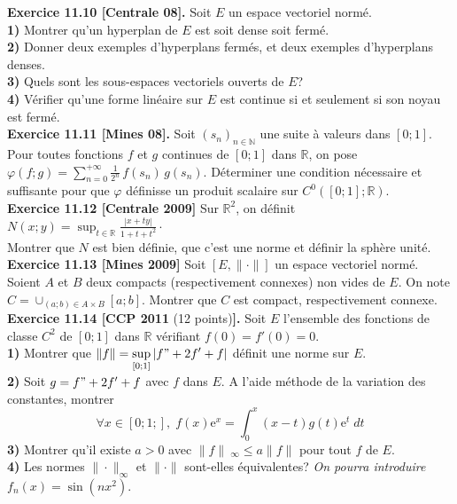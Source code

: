 \documentclass[a4paper,12pt,francais]{article}
\newcommand{\field}[1]{\mathbb{#1}}
\newcommand{\N}{\field{N}}
\newcommand{\R}{\field{R}}
\newcommand{\e}{\mbox{e}}
\begin{document}
 \noindent
 {\bf Exercice 11.10 [Centrale 08].} Soit $E$ un espace vectoriel normé.\\
 {\bf 1)} Montrer qu'un hyperplan de $E$ est soit dense soit fermé.\\
 {\bf 2)} Donner deux exemples d'hyperplans fermés, et deux exemples d'hyperplans denses.\\
 {\bf 3)} Quels sont les sous-espaces vectoriels ouverts de $E$?\\
 {\bf 4)} Vérifier qu'une forme linéaire sur $E$ est continue si et seulement si son noyau est fermé.\\ 

 \noindent
 {\bf Exercice 11.11 [Mines 08].} Soit $(s_n)_{n\in \N}$ une suite à valeurs dans $[0;1]$. Pour toutes fonctions $f$ et $g$ continues de $[0;1]$ dans $\R$, on pose $\displaystyle \varphi(f;g)=\sum_{n=0}^{+\infty} \frac{1}{2^n} \, f(s_n)\, g(s_n)$. Déterminer une condition nécessaire et suffisante pour que $\varphi$ définisse un produit scalaire sur $C^0([0;1];\R)$.\\
 
\noindent
{\bf Exercice 11.12 [Centrale 2009]} %
Sur $\R^2$, on définit $\displaystyle N(x;y)=\sup_{t\in \R} \frac{|x+ty|}{1+t+t^2} \cdot$\\
Montrer que $N$ est bien définie, que c'est une norme et définir la sphère unité.\\

\noindent
{\bf Exercice 11.13 [Mines 2009]} Soit $[E,\|\cdot\|]$ un espace vectoriel normé. Soient $A$ et $B$ deux compacts (respectivement connexes) non vides de $E$. On note $C=\cup_{(a;b)\in A \times B} [a;b]$. Montrer que $C$ est compact, respectivement connexe.\\

\noindent
{\bf Exercice 11.14 [CCP 2011} (12 points){\bf ].} Soit $E$ l'ensemble des fonctions de classe $C^2$ de $[0;1]$ dans $\R$ vérifiant $f(0)=f'(0)=0$.\\
{\bf 1)} Montrer que $\displaystyle \|f\|=\sup_{[0;1]} |f"+2f'+f|$ définit une norme sur $E$.\\
{\bf 2)} Soit $g=f"+2f'+f$ avec $f$ dans $E$. A l'aide méthode de la variation des constantes, montrer
$$\forall x\in[0;1;],\; f(x) \e^x=\int_0^x(x-t)g(t)\e^t \; dt$$
{\bf 3)} Montrer qu'il existe $a>0$ avec $\|f\|\ _{\infty} \leqslant a \|f\|$ pour tout $f$ de $E$.\\
{\bf 4)} Les normes $\|\cdot\|_{\infty}$ et $\| \cdot\|$ sont-elles équivalentes? {\it On pourra introduire $f_n(x)=\sin(nx^2)$}.\\
\end{document}
